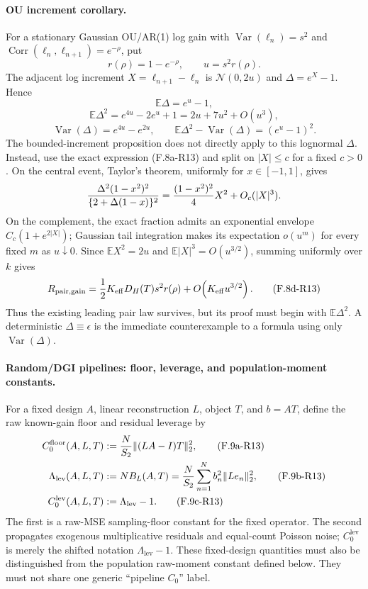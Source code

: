 \paragraph{OU increment corollary.}
For a stationary Gaussian OU/AR(1) log gain with
$\operatorname{Var}(\ell_n)=s^2$ and
$\operatorname{Corr}(\ell_n,\ell_{n+1})=e^{-\rho}$, put
\[
 r(\rho)=1-e^{-\rho},\qquad u=s^2r(\rho).
\]
The adjacent log increment $X=\ell_{n+1}-\ell_n$ is
$\mathcal N(0,2u)$ and $\Delta=e^X-1$.  Hence
\[
 \mathbb E\Delta=e^u-1,
\]
\begin{equation}
 \mathbb E\Delta^2=e^{4u}-2e^u+1
 =2u+7u^2+O(u^3), \tag{F.8c-R13}
\end{equation}
\[
 \operatorname{Var}(\Delta)=e^{4u}-e^{2u},
 \qquad
 \mathbb E\Delta^2-\operatorname{Var}(\Delta)=(e^u-1)^2.
\]
The bounded-increment proposition does not directly apply to this
lognormal $\Delta$.  Instead, use the exact expression (F.8a-R13) and
split on $|X|\le c$ for a fixed $c>0$.  On the central event, Taylor's
theorem, uniformly for $x\in[-1,1]$, gives
\[
 {\Delta^2(1-x^2)^2\over\{2+\Delta(1-x)\}^2}
 ={(1-x^2)^2\over4}X^2+O_c(|X|^3).
\]
On the complement, the exact fraction admits an exponential envelope
$C_c(1+e^{2|X|})$; Gaussian tail integration makes its expectation
$o(u^m)$ for every fixed $m$ as $u\downarrow0$.  Since
$\mathbb EX^2=2u$ and $\mathbb E|X|^3=O(u^{3/2})$, summing uniformly
over $k$ gives
\begin{equation}
 R_{\mathrm{pair,gain}}
 ={1\over2}K_{\mathrm{eff}}D_H(T)s^2r(\rho)
 +O\!\left(K_{\mathrm{eff}}u^{3/2}\right). \tag{F.8d-R13}
\end{equation}
Thus the existing leading pair law survives, but its proof must begin
with $\mathbb E\Delta^2$.  A deterministic
$\Delta\equiv\epsilon$ is the immediate counterexample to a formula
using only $\operatorname{Var}(\Delta)$.

\paragraph{Random/DGI pipelines: floor, leverage, and population-moment constants.}
For a fixed design $A$, linear reconstruction $L$, object $T$, and
$b=AT$, define the raw known-gain floor and residual leverage by
\begin{align}
 C_0^{\mathrm{floor}}(A,L,T)
 &:={N\over S_2}\|(LA-I)T\|_2^2, \tag{F.9a-R13}\\
 \Lambda_{\mathrm{lev}}(A,L,T)
 &:=NB_L(A,T)
 ={N\over S_2}\sum_{n=1}^Nb_n^2\|Le_n\|_2^2, \tag{F.9b-R13}\\
 C_0^{\mathrm{lev}}(A,L,T)&:=\Lambda_{\mathrm{lev}}-1.
 \tag{F.9c-R13}
\end{align}
The first is a raw-MSE sampling-floor constant for the fixed operator.
The second propagates exogenous multiplicative residuals and
equal-count Poisson noise; $C_0^{\mathrm{lev}}$ is merely the shifted
notation $\Lambda_{\mathrm{lev}}-1$.  These fixed-design quantities
must also be distinguished from the population raw-moment constant
defined below.  They must not share one generic ``pipeline $C_0$'' label.

